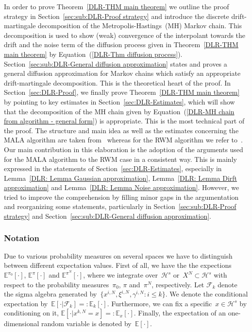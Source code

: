 In order to prove Theorem~\ref{DLR-THM main theorem} we outline the proof strategy in Section~\ref{sec:sub:DLR-Proof strategy} and introduce the discrete drift-martingale decomposition of the Metropolis-Hastings~(MH) Markov chain. This decomposition is used to show (weak) convergence of the interpolant towards the drift and the noise term of the diffusion process given in Theorem~\ref{DLR-THM main theorem} by Equation~(\ref{DLR-Thm diffusion process}). Section~\ref{sec:sub:DLR-General diffusion approximation} states and proves a general diffusion approximation for Markov chains which satisfy an appropriate drift-martingale decomposition. This is the theoretical heart of the proof. In Section~\ref{sec:DLR-Proof}, we finally prove Theorem~\ref{DLR-THM main theorem} by pointing to key estimates in Section~\ref{sec:DLR-Estimates}, which will show that the decomposition of the MH chain given by Equation~(\ref{DLR-MH chain from algorithm - general form}) is appropriate. This is the most technical part of the proof. The structure and main idea as well as the estimates concerning the MALA algorithm are taken from~\autocite{Pillai2012} whereas for the RWM algorithm we refer to~\autocite{Mattingly2010}. Our main contribution in this elaboration is the adoption of the arguments used for the MALA algorithm to the RWM case in a consistent way. This is mainly expressed in the statements of Section~\ref{sec:DLR-Estimates}, especially in Lemma~\ref{DLR: Lemma Gaussian approximation}, Lemma~\ref{DLR: Lemma Dirft approximation} and Lemma~\ref{DLR: Lemma Noise approximation}. However, we tried to improve the comprehension by filling minor gaps in the argumentation and reorganizing some statements, particularly in Section~\ref{sec:sub:DLR-Proof strategy} and Section~\ref{sec:sub:DLR-General diffusion approximation}.

\subsubsection*{Notation}

Due to various probability measures on several spaces we have to distinguish between different expectation values. First of all, we have the the expections~$\mathbb{E}^{\pi_0}[\cdot]$, $\mathbb{E}^{\pi}[\cdot]$ and $\mathbb{E}^{\pi^N}[\cdot]$, where we integrate over~$\mathcal{H}^s$ or~$X^N \subset \mathcal{H}^s$ with respect to the probability measures~$\pi_0$, $\pi$ and~$\pi^N$, respectively. Let $\mathcal{F}_k$ denote the sigma algebra generated by~$\{ x^{i,N}, \xi^{i,N}, \gamma^{i,N} : i \leq k  \}$. We denote the conditional expectation by~$\mathbb{E}[\cdot|\mathcal{F}_k] =: \mathbb{E}_k [\cdot]$. Furthermore, we can fix a specific~$x \in \mathcal{H}^s$ by conditioning on it, $\mathbb{E}[\cdot | x^{k,N} = x] =: \mathbb{E}_x[\cdot]$. Finally, the expectation of an one-dimensional random variable is denoted by~$\mathbb{E}[\cdot]$.



